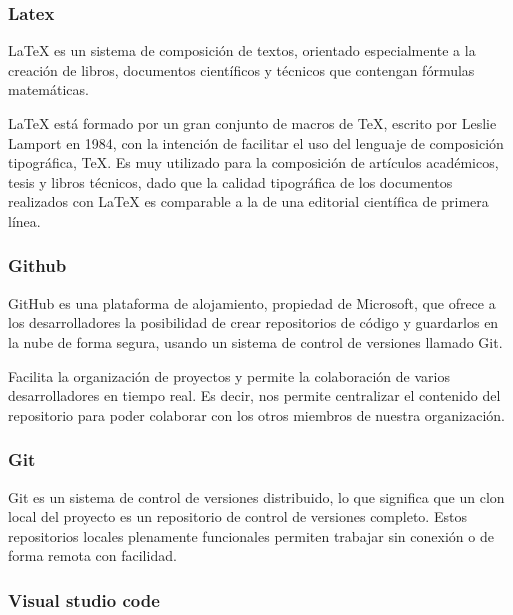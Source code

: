     \subsubsection{Latex}
    
    LaTeX es un sistema de composición de textos, orientado especialmente a la creación de libros, documentos científicos y técnicos que contengan fórmulas matemáticas.
    
    LaTeX está formado por un gran conjunto de macros de TeX, escrito por Leslie Lamport en 1984, con la intención de facilitar el uso del lenguaje de composición tipográfica, TeX. Es muy utilizado para la composición de artículos académicos, tesis y libros técnicos, dado que la calidad tipográfica de los documentos realizados con LaTeX es comparable a la de una editorial científica de primera línea.
    \cite{Dlsi.ua.es}
    
    \subsubsection{Github}
    
    GitHub es una plataforma de alojamiento, propiedad de Microsoft, que ofrece a los desarrolladores la posibilidad de crear repositorios de código y guardarlos en la nube de forma segura, usando un sistema de control de versiones llamado Git.
    
    Facilita la organización de proyectos y permite la colaboración de varios desarrolladores en tiempo real. Es decir, nos permite centralizar el contenido del repositorio para poder colaborar con los otros miembros de nuestra organización.
    \cite{Platzi}
    
    \subsubsection{Git}
    
    Git es un sistema de control de versiones distribuido, lo que significa que un clon local del proyecto es un repositorio de control de versiones completo. Estos repositorios locales plenamente funcionales permiten trabajar sin conexión o de forma remota con facilidad.
    
    \cite{Microsoft}
    
    \subsubsection{Visual studio code}
    
